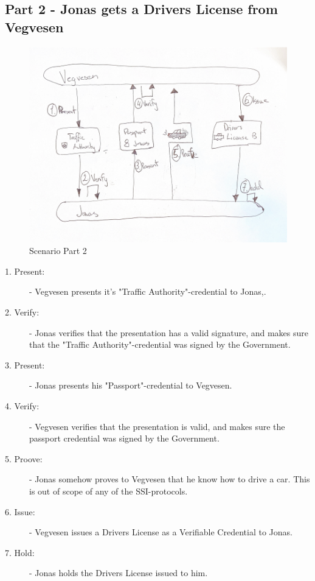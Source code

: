 \newpage

\subsection{Part 2 - Jonas gets a Drivers License from Vegvesen}

    \begin{figure}[htbp]
      \centering
      \includegraphics[width=1\textwidth]{figures/scenario-part2.png}
      \caption[]{Scenario Part 2}
    \end{figure}
    
\begin{description}
\item[1. Present:] - Vegvesen presents it's "Traffic Authority"-credential to Jonas,.
\item[2. Verify:] - Jonas verifies that the presentation has a valid signature, and makes sure that the "Traffic Authority"-credential was signed by the Government.
\item[3. Present:] - Jonas presents his "Passport"-credential to Vegvesen.
\item[4. Verify:] - Vegvesen verifies that the presentation is valid, and makes sure the passport credential was signed by the Government.
\item[5. Proove:] - Jonas somehow proves to Vegvesen that he know how to drive a car. This is out of scope of any of the SSI-protocols.
\item[6. Issue:] - Vegvesen issues a Drivers License as a Verifiable Credential to Jonas.
\item[7.  Hold:] - Jonas holds the Drivers License issued to him.
\end{description}


